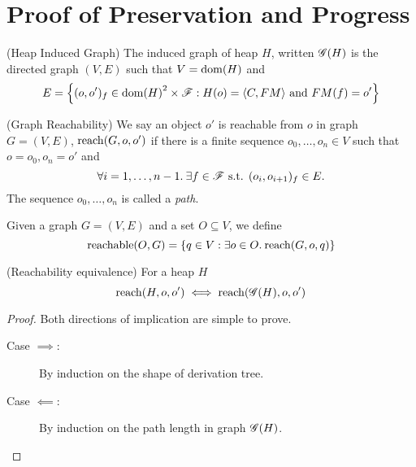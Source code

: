 \chapter{Proof of Preservation and Progress}
\label{proof_of_pnp}

\begin{definition}{(Heap Induced Graph)}
  The induced graph of heap $H$, written $\mathscr{G}{(H)}$ is the directed graph
  $(V, E)$ such that $V = \mbox{$\mathrm{dom}$}{(H)}$ and 
  \begin{equation}
    E = \left\{ (o, o')_f \in \mbox{$\mathrm{dom}$}{(H)}^2 \times \mathscr{F}: 
      H(o) = \mbox{$\langle C, FM \rangle$} \text{ and } FM(f) = o' \right\}
  \end{equation}
\end{definition}

\begin{definition}{(Graph Reachability)}
  We say an object $o'$ is reachable from $o$ in graph $G = (V,
  E)$, $\mbox{$\mathrm{reach}$}{(G, o, o')}$ if there is a finite sequence $o_0, \dots,
  o_n \in V$ such that $o = o_0, o_n = o'$ and
  \begin{equation}
    \forall i = 1,\dots, n-1. \: \exists f \in \mathscr{F} \text{ s.t. } (o_i,
    o_{i+1})_f \in E.
  \end{equation}
  The sequence $o_0, \dots, o_n$ is called a \emph{path}.
\end{definition}

\begin{definition}
  Given a graph $G = (V, E)$ and a set $O \subseteq V$, we define
  \begin{equation}
    \mbox{$\mathrm{reachable}$}{(O, G)} = \left\{ q \in V: \exists o\in O.\: \mbox{$\mathrm{reach}$}{(G, o, q)}
    \right\} \notag
  \end{equation}
\end{definition}

\begin{proposition}{(Reachability equivalence)}
  \label{prop:reacheq}
  For a heap $H$ 
  \begin{equation}
    \mbox{$\mathrm{reach}$}{(H, o, o')} \iff \mbox{$\mathrm{reach}$}{(\ensuremath{\mathscr{G}}{(H)}, o, o')}
  \end{equation}
\end{proposition}

\begin{proof}
  Both directions of implication are simple to prove.
  \begin{description}
    \item[Case $\implies$:] By induction on the shape of derivation tree.
    \item[Case $\impliedby$:] By induction on the path length in graph
      $\mathscr{G}{(H)}$.
  \end{description}
\end{proof}

